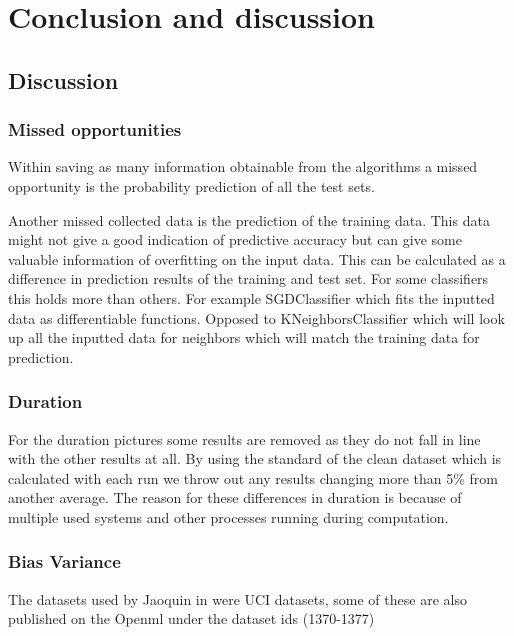 \documentclass[a4paper,10pt]{article}
\begin{document}






\newpage
\section{Conclusion and discussion} \label{Chapter5}

\subsection{Discussion}

\subsubsection{Missed opportunities}
Within saving as many information obtainable from the algorithms a missed opportunity is the probability prediction of all the test sets. 

Another missed collected data is the prediction of the training data. This data might not give a good indication of predictive accuracy but can give some valuable information of overfitting on the input data. This can be calculated as a difference in prediction results of the training and test set. For some classifiers this holds more than others. For example SGDClassifier which fits the inputted data as differentiable functions. Opposed to KNeighborsClassifier which will look up all the inputted data for neighbors which will match the training data for prediction. 

\subsubsection{Duration}
For the duration pictures some results are removed as they do not fall in line with the other results at all. By using the standard of the clean dataset which is calculated with each run we throw out any results changing more than 5$\%$ from another average.
The reason for these differences in duration is because of multiple used systems and other processes running during computation. 

\subsubsection{Bias Variance}
The datasets used by Jaoquin in \cite{Bias-var} were UCI datasets, some of these are also published on the Openml under the dataset ids (1370-1377)
\end{document}
